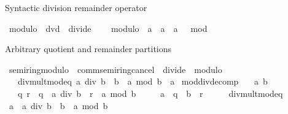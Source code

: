 \begin{isabellebody}
\begin{isamarkuptext}
Syntactic division remainder operator%
\end{isamarkuptext}\isamarkuptrue%
\isamarkupfalse%
\ modulo\ {\isacharequal}{\kern0pt}\ dvd\ {\isacharplus}{\kern0pt}\ divide\ {\isacharplus}{\kern0pt}\isanewline
\ \ \ modulo\ {\isacharcolon}{\kern0pt}{\isacharcolon}{\kern0pt}\ {\isachardoublequoteopen}{\isacharprime}{\kern0pt}a\ {\isasymRightarrow}\ {\isacharprime}{\kern0pt}a\ {\isasymRightarrow}\ {\isacharprime}{\kern0pt}a{\isachardoublequoteclose}\ \ {\isacharparenleft}{\kern0pt}\ {\isachardoublequoteopen}mod{\isachardoublequoteclose}\ {}{}{\isacharparenright}{\kern0pt}%
\begin{isamarkuptext}%
Arbitrary quotient and remainder partitions%
\end{isamarkuptext}\isamarkuptrue%
\isamarkupfalse%
\ semiring{\isacharunderscore}{\kern0pt}modulo\ {\isacharequal}{\kern0pt}\ comm{\isacharunderscore}{\kern0pt}semiring{\isacharunderscore}{\kern0pt}{}{\isacharunderscore}{\kern0pt}cancel\ {\isacharplus}{\kern0pt}\ divide\ {\isacharplus}{\kern0pt}\ modulo\ {\isacharplus}{\kern0pt}\isanewline
\ \ \ div{\isacharunderscore}{\kern0pt}mult{\isacharunderscore}{\kern0pt}mod{\isacharunderscore}{\kern0pt}eq{\isacharcolon}{\kern0pt}\ {\isachardoublequoteopen}a\ div\ b\ {\isacharasterisk}{\kern0pt}\ b\ {\isacharplus}{\kern0pt}\ a\ mod\ b\ {\isacharequal}{\kern0pt}\ a{\isachardoublequoteclose}\isanewline
{}\isanewline
\isanewline
{}\isamarkupfalse%
\ mod{\isacharunderscore}{\kern0pt}div{\isacharunderscore}{\kern0pt}decomp{\isacharcolon}{\kern0pt}\isanewline
\ \ \ a\ b\isanewline
\ \ \ q\ r\ \ {\isachardoublequoteopen}q\ {\isacharequal}{\kern0pt}\ a\ div\ b{\isachardoublequoteclose}\ \ {\isachardoublequoteopen}r\ {\isacharequal}{\kern0pt}\ a\ mod\ b{\isachardoublequoteclose}\isanewline
\ \ \ \ \ {\isachardoublequoteopen}a\ {\isacharequal}{\kern0pt}\ q\ {\isacharasterisk}{\kern0pt}\ b\ {\isacharplus}{\kern0pt}\ r{\isachardoublequoteclose}\isanewline
%
\isadelimproof
%
\endisadelimproof
%
\isatagproof
{}\isamarkupfalse%
\ {\isacharminus}{\kern0pt}\isanewline
\ \ \isamarkupfalse%
\ div{\isacharunderscore}{\kern0pt}mult{\isacharunderscore}{\kern0pt}mod{\isacharunderscore}{\kern0pt}eq\ \isamarkupfalse%
\ {\isachardoublequoteopen}a\ {\isacharequal}{\kern0pt}\ a\ div\ b\ {\isacharasterisk}{\kern0pt}\ b\ {\isacharplus}{\kern0pt}\ a\ mod\ b{\isachardoublequoteclose}\ \isamarkupfalse%

\end{isabellebody}
